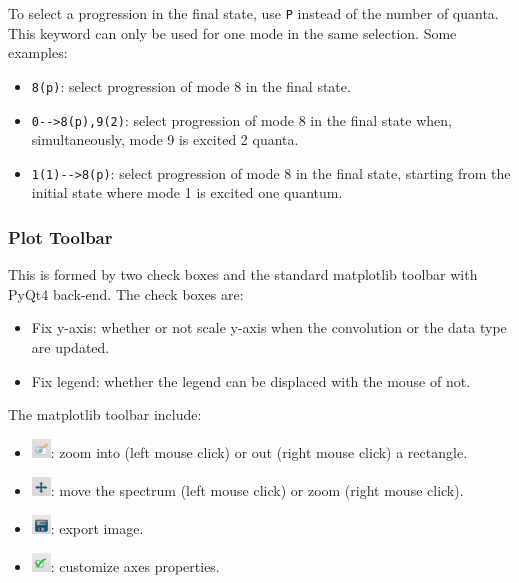 \documentclass[a4paper,11pt]{article}
\begin{document}
To select a progression in the final state, use \texttt{P} instead of the number of quanta. This keyword can only be used for one mode in the same selection. Some examples:

\begin{itemize}
 \item \texttt{8(p)}: select progression of mode 8 in the final state.
 \item \texttt{0{-}{-}>8(p),9(2)}: select progression of mode 8 in the final state when, simultaneously, mode 9 is excited 2 quanta.
 \item \texttt{1(1){-}{-}>8(p)}: select progression of mode 8 in the final state, starting from the initial state where mode 1 is excited one quantum.
\end{itemize}

\subsubsection{Plot Toolbar}
This is formed by two check boxes and the standard matplotlib toolbar with PyQt4 back-end. The check boxes are:
\begin{itemize}
 \item Fix y-axis: whether or not scale y-axis when the convolution or the data type are updated.
 \item Fix legend: whether the legend can be displaced with the mouse of not.
\end{itemize}

The matplotlib toolbar include:
\begin{itemize}
 \item \includegraphics[width=0.5cm]{figs/butt_zoom.jpg}: zoom into (left mouse click) or out (right mouse click) a rectangle.
 \item \includegraphics[width=0.5cm]{figs/butt_move.jpg}: move the spectrum (left mouse click) or zoom (right mouse click).
 \item \includegraphics[width=0.5cm]{figs/butt_save.jpg}: export image.
 \item \includegraphics[width=0.5cm]{figs/butt_edit.jpg}: customize axes properties.
\end{itemize}
\end{document}
